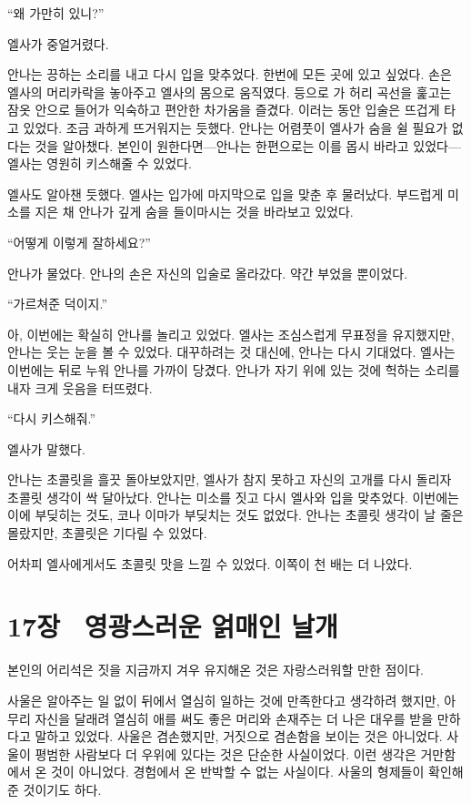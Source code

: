 ``왜 가만히 있니?''

엘사가 중얼거렸다.

안나는 끙하는 소리를 내고 다시 입을 맞추었다. 한번에 모든 곳에 있고 싶었다. 손은 엘사의 머리카락을 놓아주고 엘사의 몸으로 움직였다. 등으로 가 허리 곡선을 훑고는 잠옷 안으로 들어가 익숙하고 편안한 차가움을 즐겼다. 이러는 동안 입술은 뜨겁게 타고 있었다. 조금 과하게 뜨거워지는 듯했다. 안나는 어렴풋이 엘사가 숨을 쉴 필요가 없다는 것을 알아챘다. 본인이 원한다면—안나는 한편으로는 이를 몹시 바라고 있었다—엘사는 영원히 키스해줄 수 있었다.

엘사도 알아챈 듯했다. 엘사는 입가에 마지막으로 입을 맞춘 후 물러났다. 부드럽게 미소를 지은 채 안나가 깊게 숨을 들이마시는 것을 바라보고 있었다.

``어떻게 이렇게 잘하세요?''

안나가 물었다. 안나의 손은 자신의 입술로 올라갔다. 약간 부었을 뿐이었다.

``가르쳐준 덕이지.''

아, 이번에는 확실히 안나를 놀리고 있었다. 엘사는 조심스럽게 무표정을 유지했지만, 안나는 웃는 눈을 볼 수 있었다. 대꾸하려는 것 대신에, 안나는 다시 기대었다. 엘사는 이번에는 뒤로 누워 안나를 가까이 당겼다. 안나가 자기 위에 있는 것에 헉하는 소리를 내자 크게 웃음을 터뜨렸다.

``다시 키스해줘.''

엘사가 말했다.

안나는 초콜릿을 흘끗 돌아보았지만, 엘사가 참지 못하고 자신의 고개를 다시 돌리자 초콜릿 생각이 싹 달아났다. 안나는 미소를 짓고 다시 엘사와 입을 맞추었다. 이번에는 이에 부딪히는 것도, 코나 이마가 부딪치는 것도 없었다. 안나는 초콜릿 생각이 날 줄은 몰랐지만, 초콜릿은 기다릴 수 있었다.

어차피 엘사에게서도 초콜릿 맛을 느낄 수 있었다. 이쪽이 천 배는 더 나았다.



\chapter[17장  영광스러운 얽매인 날개][17장\hspace*{.5em}영광스러운 얽매인 날개]{17장 \ 영광스러운 얽매인 날개}



본인의 어리석은 짓을 지금까지 겨우 유지해온 것은 자랑스러워할 만한 점이다.

사울은 알아주는 일 없이 뒤에서 열심히 일하는 것에 만족한다고 생각하려 했지만, 아무리 자신을 달래려 열심히 애를 써도 좋은 머리와 손재주는 더 나은 대우를 받을 만하다고 말하고 있었다. 사울은 겸손했지만, 거짓으로 겸손함을 보이는 것은 아니었다. 사울이 평범한 사람보다 더 우위에 있다는 것은 단순한 사실이었다. 이런 생각은 거만함에서 온 것이 아니었다. 경험에서 온 반박할 수 없는 사실이다. 사울의 형제들이 확인해준 것이기도 하다.

